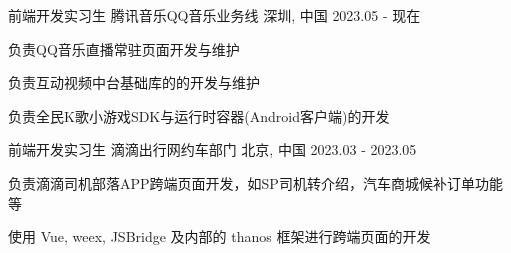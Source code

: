 

\begin{cventries}
    \cventry
    {前端开发实习生} %
    {腾讯音乐\hspace{2mm}QQ音乐业务线} %
    {深圳, 中国} %
    {2023.05 - 现在} %
    {
        \begin{cvitems} %
            \item {负责QQ音乐直播常驻页面开发与维护}
            \item {负责互动视频中台基础库的的开发与维护}
            \item {负责全民K歌小游戏SDK与运行时容器(Android客户端)的开发}
        \end{cvitems}
    }

    \cventry
    {前端开发实习生} %
    {滴滴出行\hspace{2mm}网约车部门} %
    {北京, 中国} %
    {2023.03 - 2023.05} %
    {
        \begin{cvitems} %
            \item {负责滴滴司机部落APP跨端页面开发，如SP司机转介绍，汽车商城候补订单功能等}
            \item {使用 Vue, weex, JSBridge 及内部的 thanos 框架进行跨端页面的开发}
        \end{cvitems}
    }
\end{cventries}
